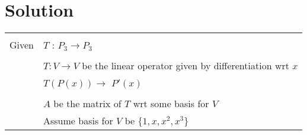 \documentclass[journal,12pt]{IEEEtran}
\begin{document}
\section{\textbf{Solution}}
	\begin{longtable}{|l|l|}
	\hline
\multirow{3}{*}{Given} &\\
& $T$ : $P_3 \xrightarrow{} P_3$ \\ 
& \\
& $T:V\xrightarrow{}V$ be the linear operator given by differentiation wrt $x$\\
& $T(P(x)) \xrightarrow{}$ $P'(x)$ \\
& \\
& $A$ be the matrix of $T$ wrt some basis for $V$ \\
& Assume basis for $V$ be $\{1,x,x^2,x^3\}$ \\
         \hline
\end{longtable}
\newpage
\end{document}
